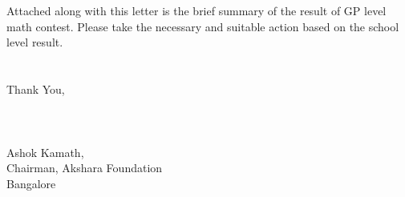 \documentclass[12pt]{article}
\begin{document}
{\\~\\
Attached along with this letter is the brief summary of the result of GP level math contest. Please take the necessary and suitable action based on the school level result.
\\~\\~\\
Thank You,
\\~\\~\\~\\
Ashok Kamath,\\
Chairman, Akshara Foundation\\
Bangalore\\
}

\pagebreak
\end{document}
